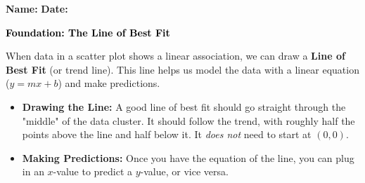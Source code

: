 \documentclass[12pt, letterpaper, fleqn]{article}
\begin{document}
\textbf{Name:} \underline{\hspace{5cm}}
\hfill
\textbf{Date:} \underline{\hspace{3cm}}\\

\begin{tcolorbox}[colback=customteal!20]
    \large\textcolor{black}{\textbf{Foundation: The Line of Best Fit}}
\end{tcolorbox}

\vspace{3mm}

\noindent
When data in a scatter plot shows a linear association, we can draw a \textbf{Line of Best Fit} (or trend line). This line helps us model the data with a linear equation ($y=mx+b$) and make predictions.

\begin{itemize}
    \item \textbf{Drawing the Line:} A good line of best fit should go straight through the "middle" of the data cluster. It should follow the trend, with roughly half the points above the line and half below it. It \textit{does not} need to start at $(0,0)$.
    \item \textbf{Making Predictions:} Once you have the equation of the line, you can plug in an $x$-value to predict a $y$-value, or vice versa.
\end{itemize}

\vspace{4mm}
\end{document}
